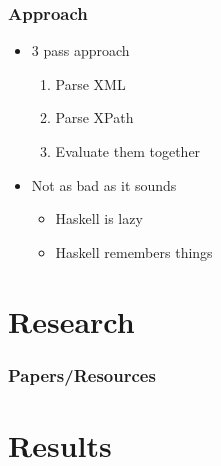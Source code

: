 \documentclass{beamer}
\begin{document}
\begin{frame}
\frametitle{Approach}

\begin{itemize}
\item 3 pass approach
	\begin{enumerate}
	\item Parse XML
	\item Parse XPath
	\item Evaluate them together
	\end{enumerate}
\pause
\item Not as bad as it sounds
	\begin{itemize}
	\item Haskell is lazy
	\item Haskell remembers things
	\end{itemize}
\end{itemize}
\end{frame}

\section{Research}
\begin{frame}
\frametitle{Papers/Resources}

\nocite{parsec}
\nocite{xmlspec}
\nocite{xpathspec}
\nocite{designandimplement}
\nocite{xpathtokenizer}
%
 

\end{frame}

\section{Results}
\end{document}

